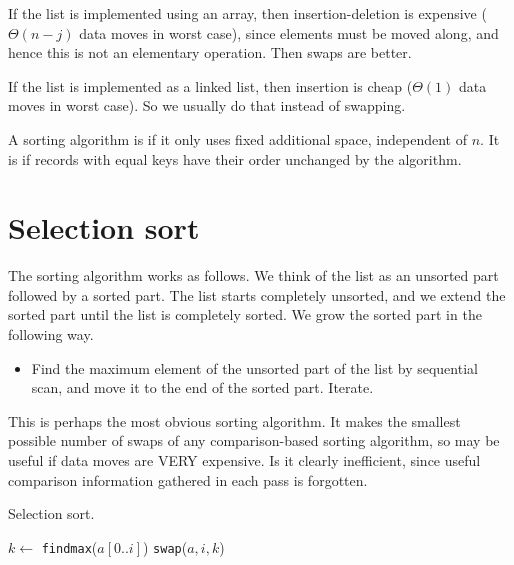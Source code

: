 If the list is implemented using an array, then insertion-deletion is expensive ($\Theta(n-j)$ data moves in worst case), 
since elements must be moved along, and hence this is not an elementary operation. Then swaps are better.

If the list is implemented as a linked list, then insertion is cheap ($\Theta(1)$ data moves in worst case).
So we usually do that instead of swapping.

\begin{Definition}
A sorting algorithm is  if it only uses fixed additional space, independent of $n$.
It is  if records with equal keys have their order unchanged by the algorithm.
\end{Definition}



\section{Selection sort} %
\label{sec:selectionsort}
The sorting algorithm  works as follows.
We think of the list as an unsorted part followed by a sorted part.
The list starts completely unsorted, and we extend the sorted part until the list is completely sorted.
We grow the sorted part in the following way.
\begin{itemize} 
  \item Find the maximum element of the unsorted part of the list by sequential
  scan, and move it to the end of the sorted part. Iterate.
\end{itemize} 

This is perhaps the most obvious sorting algorithm. 
It makes the smallest possible number of swaps of any comparison-based sorting algorithm, 
so may be useful if data moves are VERY expensive.
Is it clearly inefficient, since useful comparison information gathered in each pass is forgotten.

\begin{algorithm}[H]
  \caption{Selection sort.}
    \label{alg:selsort}
\begin{algorithmic}[1]
	\State $k \gets $ \texttt{findmax}($a[0..i]$) 
		\State \texttt{swap}($a,i,k$)
	\EndIf
\EndFor
\State {}
\EndFunction
\end{algorithmic}
\end{algorithm}

